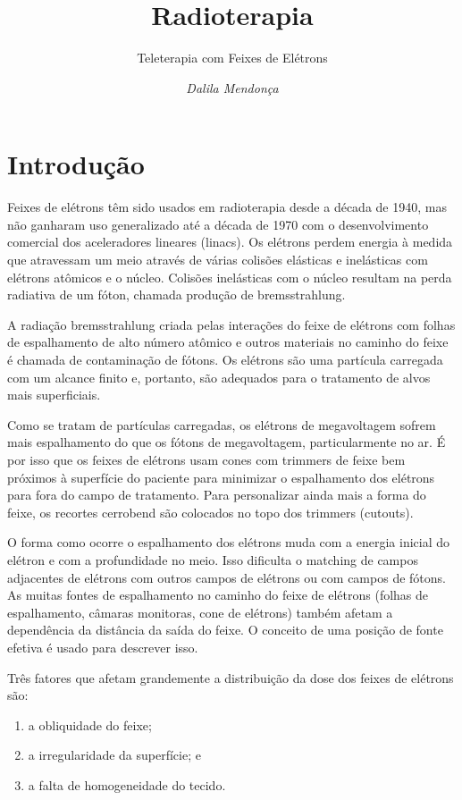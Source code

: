 \documentclass[11pt,a4paper]{article}
\title{\LobsterTwo\Huge{Radioterapia}}
\author{\LobsterTwo\Large{Teleterapia com Feixes de Elétrons}\nocite{*}}
\date{\LobsterTwo\textit{Dalila Mendonça}}
\begin{document}
	\maketitle

\section{Introdução}

	Feixes de elétrons têm sido usados em radioterapia desde a década de 1940, mas não ganharam uso generalizado até a década de 1970 com o desenvolvimento comercial dos aceleradores lineares (linacs). Os elétrons perdem energia à medida que atravessam um meio através de várias colisões elásticas e inelásticas com elétrons atômicos e o núcleo. Colisões inelásticas com o núcleo resultam na perda radiativa de um fóton, chamada produção de bremsstrahlung.
	
	A radiação bremsstrahlung criada pelas interações do feixe de elétrons com folhas de espalhamento de alto número atômico e outros materiais no caminho do feixe é chamada de contaminação de fótons. Os elétrons são uma partícula carregada com um alcance finito e, portanto, são adequados para o tratamento de alvos mais superficiais.

	Como se tratam de partículas carregadas, os elétrons de megavoltagem sofrem mais espalhamento do que os fótons de megavoltagem, particularmente no ar. É por isso que os feixes de elétrons usam cones com trimmers de feixe bem próximos à superfície do paciente para minimizar o espalhamento dos elétrons para fora do campo de tratamento. Para personalizar ainda mais a forma do feixe, os recortes cerrobend são colocados no topo dos trimmers (cutouts).

	O forma como ocorre o espalhamento dos elétrons muda com a energia inicial do elétron e com a profundidade no meio. Isso dificulta o matching de campos adjacentes de elétrons com outros campos de elétrons ou com campos de fótons. As muitas fontes de espalhamento no caminho do feixe de elétrons (folhas de espalhamento, câmaras monitoras, cone de elétrons) também afetam a dependência da distância da saída do feixe. O conceito de uma posição de fonte efetiva é usado para descrever isso.

	Três fatores que afetam grandemente a distribuição da dose dos feixes de elétrons são:
	
	\begin{enumerate}
		\item a obliquidade do feixe;
		\item a irregularidade da superfície; e
		\item a falta de homogeneidade do tecido.
	\end{enumerate}
	
\end{document}
